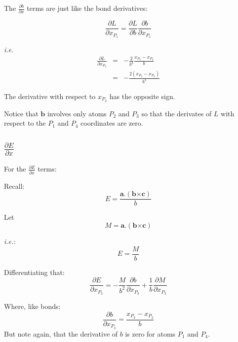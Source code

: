 \documentclass[a4paper,twocolumn,9pt]{article}
\begin{document}
The $\frac{\partial b}{\partial x}$ terms are just like the bond
derivatives:

\begin{displaymath}
  \frac{\partial L}{\partial x_{P_1}} = \frac{\partial L}{\partial b} \frac{\partial b}{\partial x_{P_1}}
\end{displaymath}

\emph{i.e. }
\begin{eqnarray*}
  \frac{\partial L}{\partial x_{P_3}} & = &-\frac{2}{b^3} \frac{x_{P_3}-x_{P_2}}{b}\\
  & = &-\frac{2(x_{P_3}-x_{P_2})}{b^4}
\end{eqnarray*}

The derivative with respect to $x_{P_2}$ has the opposite sign.

Notice that $\mathbf{b}$ involves only atoms $P_2$ and $P_3$ so that
the derivates of $L$ with respect to the $P_1$ and $P_4$ coordinates are zero.

\subsection{$\frac{\partial E}{\partial x}$}
For the $\frac{\partial E}{\partial x}$ terms: 

Recall:
\begin{displaymath}
  E = \frac{\mathbf{a}.(\mathbf{b} \mathbf{\times}\mathbf{c})}{b}
\end{displaymath}

Let
\begin{displaymath}
  M = \mathbf{a}.(\mathbf{b} \mathbf{\times}\mathbf{c})
\end{displaymath}

\emph{i.e.}:
\begin{displaymath}
  E = \frac{M}{b}
\end{displaymath}

Differentiating that:
\begin{displaymath}
  \frac{\partial E}{\partial x_{P_3}} = -\frac{M}{b^2} \frac{\partial b}{\partial x_{P_3}} 
  +  \frac{1}{b} \frac{\partial M}{\partial x_{P_3}}
\end{displaymath}

Where, like bonds:
\begin{displaymath}
  \frac{\partial b}{\partial x_{P_3}} = \frac{x_{P_3}-x_{P_2}}{b}
\end{displaymath}
But note again, that the derivative of $b$ is zero for atoms $P_1$ and $P_4$.
\end{document}
